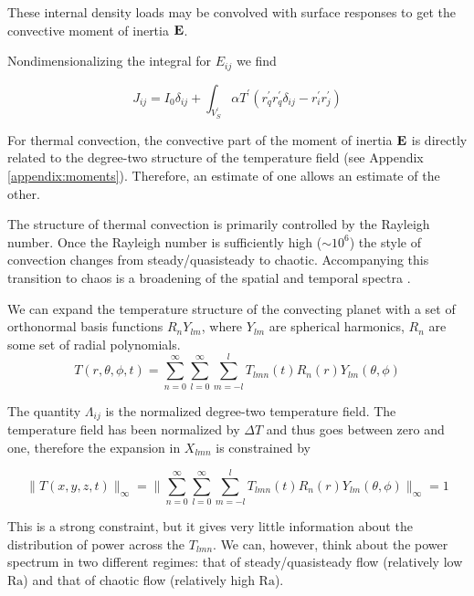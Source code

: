 \documentclass[extra,mreferee]{gji}
\begin{document}
These internal density loads may be convolved with surface responses to get the convective moment of inertia $\bf E$.

Nondimensionalizing the integral for $E_{ij}$ we find

\begin{equation}
J_{ij} = I_0 \delta_{ij} + \int_{V_S^\prime} \alpha T^\prime \left( r_q^\prime r_q^\prime \delta_{ij} - r_i^\prime r_j^\prime \right) 
\end{equation}


For thermal convection, the convective part of the moment of inertia $\bf E$ is directly related to the degree-two structure of the temperature field (see Appendix \ref{appendix:moments}).
Therefore, an estimate of one allows an estimate of the other.


The structure of thermal convection is primarily controlled by the Rayleigh number.  Once the Rayleigh number is sufficiently high ($\sim10^6$) 
the style of convection changes from steady/quasisteady to chaotic.  Accompanying this transition to chaos is a broadening of the spatial 
and temporal spectra \citep{mclaughlin1982transition}.  

We can expand the temperature structure of the convecting planet with a set of orthonormal basis functions $R_n Y_{lm}$, 
where $Y_{lm}$ are spherical harmonics, $R_n$ are some set of radial polynomials.  
\begin{equation} 
T( r , \theta, \phi, t )  = {\displaystyle \sum_{n=0}^\infty \sum_{l=0}^\infty \sum_{m=-l}^{l} } T_{lmn}(t) R_n(r) Y_{lm} (\theta , \phi)
\label{T_series}
\end{equation}

The quantity $\Lambda_{ij}$ is the normalized degree-two temperature field.  The temperature field has been normalized by $\Delta T$ and thus goes between zero and one, therefore the expansion in $X_{lmn}$ is constrained by

\begin{equation}
\lVert T(x,y,z, t) \rVert_\infty = \lVert {\displaystyle \sum_{n=0}^\infty \sum_{l=0}^\infty \sum_{m=-l}^{l} } T_{lmn}(t) R_n(r) Y_{lm} (\theta , \phi) \rVert_\infty = 1
\end{equation}

This is a strong constraint, but it gives very little information about the distribution of power across the $T_{lmn}$.  
We can, however, think about the power spectrum in two different regimes: that of steady/quasisteady flow (relatively low $\mathrm{Ra}$) and that of chaotic flow (relatively high $\mathrm{Ra}$).
\end{document}
